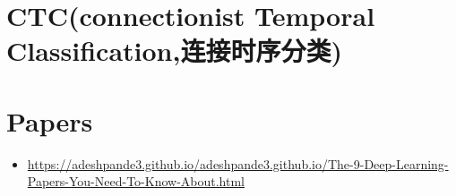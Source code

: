 \documentclass[10pt,a4paper]{ctexbook}
\begin{document}
\section{CTC(connectionist Temporal Classification,连接时序分类)}

\section{Papers}
\begin{itemize}
\item \href{The 9 Deep Learning Papers You Need To Know About (Understanding CNNs Part 3)}{https://adeshpande3.github.io/adeshpande3.github.io/The-9-Deep-Learning-Papers-You-Need-To-Know-About.html}
\end{itemize}




\ifx\mlbook\undefined
    
\end{document}
